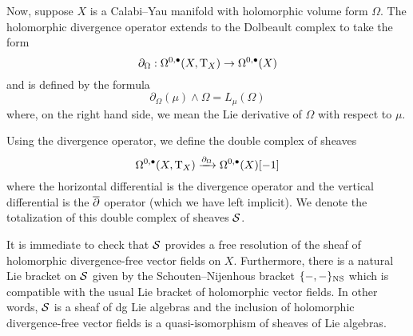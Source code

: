 \documentclass[11pt]{amsart}
\def\pv{{\rm PV}}
\def\T{{\rm T}}
\begin{document}
Now, suppose $X$ is a Calabi--Yau manifold with holomorphic volume form $\Omega$.
The holomorphic divergence operator extends to the Dolbeault complex to take the form
\[
  \partial_\Omega : \Omega^{0,\bu}(X, \T_X) \to \Omega^{0,\bu}(X)
\]
and is defined by the formula
\[
  \partial_\Omega (\mu) \wedge \Omega = L_\mu (\Omega)
\]
where, on the right hand side, we mean the Lie derivative of $\Omega$ with respect to $\mu$.

Using the divergence operator, we define the double complex of sheaves
\[
\Omega^{0,\bu}(X, \T_X) \xto{\partial_\Omega} \Omega^{0,\bu}(X) [-1] 
\]
where the horizontal differential is the divergence operator and the vertical differential is the $\overline{\partial}$ operator (which we have left implicit). 
We denote the totalization of this double complex of sheaves $\mathcal S$. 

It is immediate to check that $\mathcal S$ provides a free resolution of the sheaf of holomorphic divergence-free vector fields on $X$.
Furthermore, there is a natural Lie bracket on $\mathcal S$ given by the Schouten--Nijenhous bracket $\{-,-\}_{\rm NS}$ which is compatible with the usual Lie bracket of holomorphic vector fields. 
In other words, $\mathcal S$ is a sheaf of dg Lie algebras and the inclusion of holomorphic divergence-free vector fields is a quasi-isomorphism of sheaves of Lie algebras.







\end{document}
